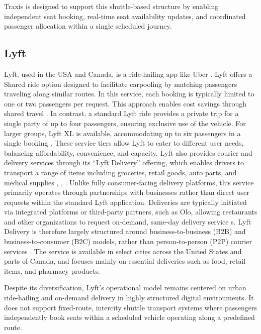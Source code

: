 Traxis is designed to support this shuttle-based structure by enabling
independent seat booking, real-time seat availability updates, and coordinated
passenger allocation within a single scheduled journey.






\subsection{Lyft}
Lyft, used in the USA and Canada, is a ride-hailing app like Uber
\cite{relawding2021lyft}. Lyft offers a Shared ride option designed to
facilitate carpooling by matching passengers traveling along similar routes. In
this service, each booking is typically limited to one or two passengers per
request. This approach enables cost savings through shared travel
\cite{yahoo2022lyftshared}. In contrast, a standard Lyft ride provides a private
trip for a single party of up to four passengers, ensuring exclusive use of the
vehicle. For larger groups, Lyft XL is available, accommodating up to six
passengers in a single booking \cite{lyft2026riderpolicies}. These service tiers
allow Lyft to cater to different user needs, balancing affordability,
convenience, and capacity. Lyft also provides courier and delivery services
through its “Lyft Delivery” offering, which enables drivers to transport a range
of items including groceries, retail goods, auto parts, and medical supplies
\cite{pymnts2020lyftdelivery}, \cite{rideshareguy2023lyftdelivery},
\cite{fastcompany2020lyft}. Unlike fully consumer-facing delivery platforms,
this service primarily operates through partnerships with businesses rather than
direct user requests within the standard Lyft application. Deliveries are
typically initiated via integrated platforms or third-party partners, such as
Olo, allowing restaurants and other organizations to request on-demand, same-day
delivery service \cite{littman2021lyftolo}s. Lyft Delivery is therefore largely
structured around business-to-business (B2B) and business-to-consumer (B2C)
models, rather than person-to-person (P2P) courier services
\cite{wiklund2021lyftstrategy}. The service is available in select cities across
the United States and parts of Canada, and focuses mainly on essential
deliveries such as food, retail items, and pharmacy products.


Despite its diversification, Lyft’s operational model remains centered on urban
ride-hailing and on-demand delivery in highly structured digital environments.
It does not support fixed-route, intercity shuttle transport systems where
passengers independently book seats within a scheduled vehicle operating along a
predefined route.


